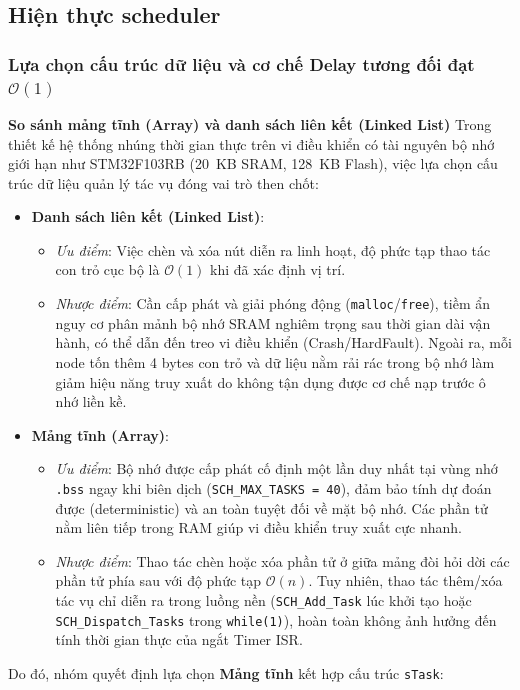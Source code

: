 \subsection{Hiện thực scheduler}

\subsubsection{Lựa chọn cấu trúc dữ liệu và cơ chế Delay tương đối đạt $\mathcal{O}(1)$}

\textbf{So sánh mảng tĩnh (Array) và danh sách liên kết (Linked List)}
Trong thiết kế hệ thống nhúng thời gian thực trên vi điều khiển có tài nguyên bộ nhớ giới hạn như STM32F103RB (20~KB SRAM, 128~KB Flash), việc lựa chọn cấu trúc dữ liệu quản lý tác vụ đóng vai trò then chốt:
\begin{itemize}
    \item \textbf{Danh sách liên kết (Linked List)}: 
    \begin{itemize}
        \item \textit{Ưu điểm}: Việc chèn và xóa nút diễn ra linh hoạt, độ phức tạp thao tác con trỏ cục bộ là $\mathcal{O}(1)$ khi đã xác định vị trí.
        \item \textit{Nhược điểm}: Cần cấp phát và giải phóng động (\texttt{malloc}/\texttt{free}), tiềm ẩn nguy cơ phân mảnh bộ nhớ SRAM nghiêm trọng sau thời gian dài vận hành, có thể dẫn đến treo vi điều khiển (Crash/HardFault). Ngoài ra, mỗi node tốn thêm 4 bytes con trỏ và dữ liệu nằm rải rác trong bộ nhớ làm giảm hiệu năng truy xuất do không tận dụng được cơ chế nạp trước ô nhớ liền kề.
    \end{itemize}
    \item \textbf{Mảng tĩnh (Array)}:
    \begin{itemize}
        \item \textit{Ưu điểm}: Bộ nhớ được cấp phát cố định một lần duy nhất tại vùng nhớ \texttt{.bss} ngay khi biên dịch (\texttt{SCH\_MAX\_TASKS = 40}), đảm bảo tính dự đoán được (deterministic) và an toàn tuyệt đối về mặt bộ nhớ. Các phần tử nằm liên tiếp trong RAM giúp vi điều khiển truy xuất cực nhanh.
        \item \textit{Nhược điểm}: Thao tác chèn hoặc xóa phần tử ở giữa mảng đòi hỏi dời các phần tử phía sau với độ phức tạp $\mathcal{O}(n)$. Tuy nhiên, thao tác thêm/xóa tác vụ chỉ diễn ra trong luồng nền (\texttt{SCH\_Add\_Task} lúc khởi tạo hoặc \texttt{SCH\_Dispatch\_Tasks} trong \texttt{while(1)}), hoàn toàn không ảnh hưởng đến tính thời gian thực của ngắt Timer ISR.
    \end{itemize}
\end{itemize}
Do đó, nhóm quyết định lựa chọn \textbf{Mảng tĩnh} kết hợp cấu trúc \texttt{sTask}:

